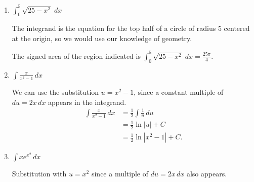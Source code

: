 \documentclass[main]{subfiles}
\begin{document}
\begin{enumerate}
\begin{enumerate}
        \item 
    \begin{problem}[\vfill\newpage]
        $\displaystyle \int_0^5 \sqrt{25-x^2}\;dx$
    \end{problem}

    \begin{solution}
        The integrand is the equation for the top half of a circle of radius 5 centered at the origin, so we would use our knowledge of geometry.

        The signed area of the region indicated is  
        $\displaystyle \int_0^5 \sqrt{25-x^2}\;dx = \frac{25\pi}{4}$.
      \begin{center}
      \end{center}
    
        
    \end{solution}

    \item
    \begin{problem}[\vfill]
        $\displaystyle \int\frac{x}{x^2-1}\,dx$
    \end{problem}

    \begin{solution}
        We can use the substitution $u=x^2-1$, since a constant multiple of 
        $du = 2x\,dx$ appears in the integrand.
        \begin{align*}
            \int\frac{x}{x^2-1}\,dx &= \frac{1}{2} \int \frac{1}{u}\, du \\
            &= \frac{1}{2}\ln|u| +C \\
            &= \frac{1}{2}\ln|x^2-1| + C.
        \end{align*}
    \end{solution}

    \item
    \begin{problem}[\vfill]
        $\displaystyle \int xe^{x^2}\, dx$
    \end{problem}

    \begin{solution}
        Substitution with $u=x^2$ since a multiple of $du = 2x\, dx$ also appears.


\end{solution}
\end{enumerate}
\end{enumerate}
\end{document}

